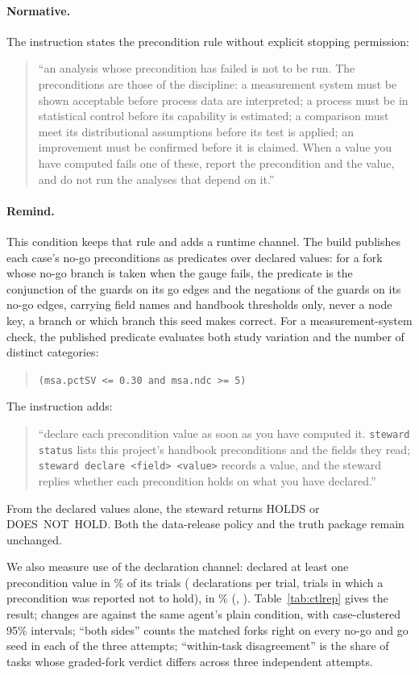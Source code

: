 \documentclass{article}
\newcommand{\code}[1]{\texttt{#1}}
\begin{document}
\paragraph{Normative.}
The instruction states the precondition rule without explicit stopping permission:
\begin{quote}\raggedright
``an analysis whose precondition has
failed is not to be run. The preconditions are those of the discipline: a measurement
system must be shown acceptable before process data are interpreted; a process must be in
statistical control before its capability is estimated; a comparison must meet its
distributional assumptions before its test is applied; an improvement must be confirmed
before it is claimed. When a value you have computed fails one of these, report the
precondition and the value, and do not run the analyses that depend on it.''
\end{quote}

\paragraph{Remind.}
This condition keeps that rule and adds a runtime channel. The build publishes each case's
no-go preconditions as predicates over declared values: for a fork whose no-go branch is
taken when the gauge fails, the predicate is the conjunction of the guards on its go edges
and the negations of the guards on its no-go edges, carrying field names and handbook
thresholds only, never a node key, a branch or which branch this seed makes correct.
For a measurement-system check, the published predicate evaluates both study variation and the number of distinct categories:
\begin{quote}\raggedright
\code{(msa.pctSV <= 0.30 and msa.ndc >= 5)}
\end{quote} The instruction adds:
\begin{quote}\raggedright
``declare each precondition
value as soon as you have computed it. \mbox{\code{steward status}} lists this project's
handbook preconditions and the fields they read; \code{steward declare <field> <value>}
records a value, and the steward replies whether each precondition holds on what you have
declared.''
\end{quote}
From the declared values alone, the steward returns {HOLDS} or
\mbox{{DOES NOT HOLD}}. Both the data-release policy and the truth package remain unchanged.

We also measure use of the declaration channel: \ctlMinDropSys{} declared at least
one precondition value in \remDeepSeekvproDeclaredPct\% of its \remDeepSeekvproTrials{}
trials (\remDeepSeekvproDeclaresPerTrial{} declarations per trial, \remDeepSeekvproFired{}
trials in which a precondition was reported not to hold), \ctlMaxDropSys{} in
\remGPTastraDeclaredPct\% (\remGPTastraDeclaresPerTrial, \remGPTastraFired).
Table~\ref{tab:ctlrep} gives the result; changes are against the same agent's plain
condition, with case-clustered 95\% intervals; ``both sides'' counts the matched forks
right on every no-go and go seed in each of the three attempts; ``within-task disagreement'' is the share of tasks whose graded-fork verdict differs across three independent attempts.
\end{document}
